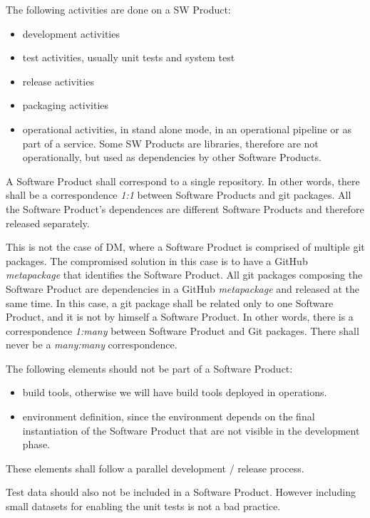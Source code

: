The following activities are done on a SW Product:
\begin{itemize}
\item development activities
\item test activities, usually unit tests and system test
\item release activities
\item packaging activities
\item operational activities, in stand alone mode, in an operational pipeline or as part of a service. Some SW Products are libraries, therefore are not operationally, but used as dependencies by other Software Products.
\end{itemize}

A Software Product shall correspond to a single repository. 
In other  words, there shall be a correspondence \textit{1:1} between Software Products and git packages.
All the Software Product's dependences are different Software Products and therefore released separately.

This is not the case of DM, where a Software Product is comprised of multiple git packages.
The compromised solution in this case is to have a GitHub \textit{metapackage} that identifies the Software Product.
All git packages composing the Software Product are dependencies in a GitHub \textit{metapackage} and released at the same time.
In this case, a git package shall be related only to one Software Product, and it is not by himself a Software Product.
In other words, there is a correspondence \textit{1:many} between Software Product and Git packages. 
There shall never be a \textit{many:many} correspondence.

The following elements should not be part of a Software Product:

\begin{itemize}
\item build tools, otherwise we will have build tools deployed in operations.
\item environment definition, since the environment depends on the final instantiation of the Software Product that are not visible in the development phase.
\end{itemize}

These elements shall follow a parallel development / release process.

Test data should also not be included in a Software Product. However including small datasets for enabling the unit tests is not a bad practice.

